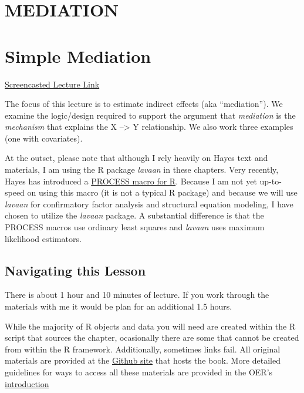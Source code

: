 \documentclass[
  english,
]{book}
\begin{document}
\hypertarget{MED}{%
\chapter*{MEDIATION}\label{MED}}

\hypertarget{SimpleMed}{%
\chapter{Simple Mediation}\label{SimpleMed}}

\href{https://spu.hosted.panopto.com/Panopto/Pages/Viewer.aspx?pid=7ffb03e6-b34b-4e0b-8f10-ad080180b069}{Screencasted Lecture Link}

The focus of this lecture is to estimate indirect effects (aka ``mediation''). We examine the logic/design required to support the argument that \emph{mediation} is the \emph{mechanism} that explains the X --\textgreater{} Y relationship. We also work three examples (one with covariates).

At the outset, please note that although I rely heavily on Hayes \citeyearpar{hayes_introduction_2018} text and materials, I am using the R package \emph{lavaan} in these chapters. Very recently, Hayes has introduced a \href{https://www.processmacro.org/index.html}{PROCESS macro for R}. Because I am not yet up-to-speed on using this macro (it is not a typical R package) and because we will use \emph{lavaan} for confirmatory factor analysis and structural equation modeling, I have chosen to utilize the \emph{lavaan} package. A substantial difference is that the PROCESS macros use ordinary least squares and \emph{lavaan} uses maximum likelihood estimators.

\hypertarget{navigating-this-lesson-4}{%
\section{Navigating this Lesson}\label{navigating-this-lesson-4}}

There is about 1 hour and 10 minutes of lecture. If you work through the materials with me it would be plan for an additional 1.5 hours.

While the majority of R objects and data you will need are created within the R script that sources the chapter, ocasionally there are some that cannot be created from within the R framework. Additionally, sometimes links fail. All original materials are provided at the \href{https://github.com/lhbikos/ReC_MultivModel}{Github site} that hosts the book. More detailed guidelines for ways to access all these materials are provided in the OER's \protect\hyperlink{ReCintro}{introduction}
\end{document}

